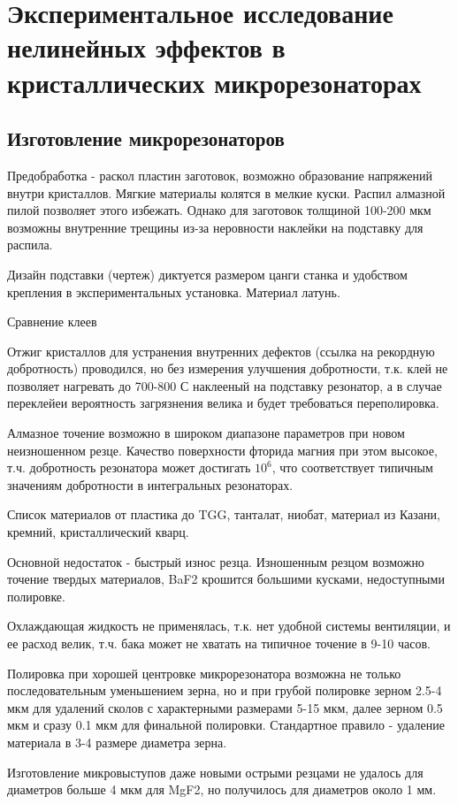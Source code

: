 \chapter{Экспериментальное исследование нелинейных эффектов в кристаллических микрорезонаторах} \label{chapt3}

\section{Изготовление микрорезонаторов}

Предобработка - раскол пластин заготовок, возможно образование напряжений внутри кристаллов. Мягкие материалы колятся в мелкие куски. Распил алмазной пилой позволяет этого избежать. Однако для заготовок толщиной 100-200 мкм возможны внутренние трещины из-за неровности наклейки на подставку для распила.

Дизайн подставки (чертеж) диктуется размером цанги станка и удобством крепления в экспериментальных установка. Материал латунь.

Сравнение клеев

Отжиг кристаллов для устранения внутренних дефектов (ссылка на рекордную добротность) проводился, но без измерения улучшения добротности, т.к. клей не позволяет нагревать до 700-800 С наклееный на подставку резонатор, а в случае переклейеи вероятность загрязнения велика и будет требоваться переполировка.

Алмазное точение возможно в широком диапазоне параметров при новом неизношенном резце. Качество поверхности фторида магния при этом высокое, т.ч. добротность резонатора может достигать $10^6$, что соответствует типичным значениям добротности в интегральных резонаторах.

Список материалов от пластика до TGG, танталат, ниобат, материал из Казани, кремний, кристаллический кварц.

Основной недостаток - быстрый износ резца. Изношенным резцом возможно точение твердых материалов, BaF2 крошится большими кусками, недоступными полировке.

Охлаждающая жидкость не применялась, т.к. нет удобной системы вентиляции, и ее расход велик, т.ч. бака может не хватать на типичное точение в 9-10 часов.

Полировка при хорошей центровке микрорезонатора возможна не только последовательным уменьшением зерна, но и при грубой полировке зерном 2.5-4 мкм для удалений сколов с характерными размерами 5-15 мкм, далее зерном 0.5 мкм и сразу 0.1 мкм для финальной полировки. Стандартное правило - удаление материала в 3-4 размере диаметра зерна.

Изготовление микровыступов даже новыми острыми резцами не удалось для диаметров больше 4 мкм для MgF2, но получилось для диаметров около 1 мм. 